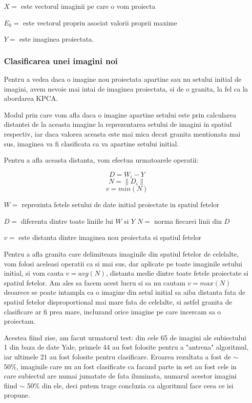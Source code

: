 \documentclass[12pt]{article}
\begin{document}
$X=$ este vectorul imaginii pe care o vom proiecta

$E_0=$ este vectorul propriu asociat valorii proprii maxime

$Y=$ este imaginea proiectata.

\newpage
\subsubsection{Clasificarea unei imagini noi}

Pentru a vedea daca o imagine nou proiectata apartine sau nu setului initial de imagini, avem nevoie mai intai de imaginea proiectata, si de o granita, la fel ca la abordarea KPCA.

Modul prin care vom afla daca o imagine apartine setului este prin calcularea distantei de la aceasta imagine la reprezentarea setului de imagini in spatiul respectiv, iar daca valorea aceasta este mai mica decat granita mentionata mai sus, imaginea va fi clasificata ca va apartine setului initial.

Pentru a afla aceasta distanta, vom efectua urmatoarele operatii:

\begin{equation}
D=W_i-Y
\end{equation}
\begin{equation}
N=\| D_i  \|
\end{equation}
\begin{equation}
v=min(N)
\end{equation}

$W=$ reprezinta fetele setului de date initial proiectate in spatiul fetelor

$D=$ diferenta dintre toate liniile lui $W$ si $Y$ 
$N=$ norma fiecarei linii din $D$

$v=$ este distanta dintre imaginea nou proiectata si spatiul fetelor

Pentru a afla granita care delimiteaza imaginile din spatiul fetelor de celelalte, vom folosi aceleasi operatii ca si mai sus, dar aplicate pe toate imaginile setului initial, si vom cauta $v=avg(N)$, distanta medie dintre toate fetele proiectate si spatiul fetelor. Am ales sa facem acest lucru si sa nu cautam $v=max(N)$ deoarece se poate intampla ca o imagine din setul initial sa aiba distanta fata de spatiul fetelor disproportional mai mare fata de celelalte, si astfel granita de clasificare ar fi prea mare, incluzand orice imagine pe care incercam sa o proiectam.

Acestea fiind zise, am facut urmatorul test: din cele 65 de imagini ale subiectului 1 din baza de date Yale, primele 44 au fost folosite pentru a "antrena" algoritmul, iar ultimele 21 au fost folosite pentru clasificare. Eroarea rezultata a fost de $\sim$ 50\%, imaginile care nu au fost clasificate ca facand parte in set au fost cele in care subiectul are numai jumatate de fata iluminata, numarul acestor imagini fiind $\sim$ 50\% din ele, deci putem trage concluzia ca algoritmul face ceea ce isi propune. 
\end{document}
